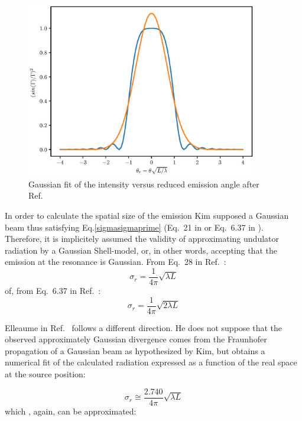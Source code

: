 \documentclass{iucr}              %
\begin{document}
\begin{figure}
  \centering
  \includegraphics[width=0.90\textwidth]{FIGURES/undulator_fit.eps} 
  \caption{Gaussian fit of the intensity versus reduced emission angle after Ref.~\cite{elleaume}}
  \label{fig:undulator_fit}
\end{figure}


In order to calculate the spatial size of the emission Kim supposed a Gaussian beam thus satisfying Eq.\ref{sigmasigmaprime} (Eq.~21 in \cite{kim1986b} or Eq.~6.37 in \cite{kim1989}). Therefore, it is implicitely assumed the validity of approximating undulator radiation by a Gaussian Shell-model, or, in other words, accepting that the emission at the resonance is Gaussian. 
From Eq.~28 in Ref.~\cite{kim1986b}: 
\begin{equation}
\sigma_r = \frac{1}{4 \pi} \sqrt{\lambda L} 
\label{kim_sigma}
\end{equation}
of, from Eq.~6.37 in Ref.~\cite{kim1989}: 
\begin{equation}
\sigma_r = \frac{1}{4 \pi} \sqrt{2 \lambda L} 
\label{kimnew_sigma}
\end{equation}

Elleaume in Ref.~\cite{elleaume} follows a different direction. He does not suppose that the observed approximately Gaussian divergence comes from the Fraunhofer propagation of a Gaussian beam as hypothesized by Kim, but obtains a numerical fit of the calculated radiation expressed as a function of the real space at the source position: 

\begin{equation}
\sigma_r \cong \frac{2.740}{4 \pi} \sqrt{\lambda L} 
\label{elleaume_sigma}
\end{equation}
which , again, can be approximated: 
\end{document}

